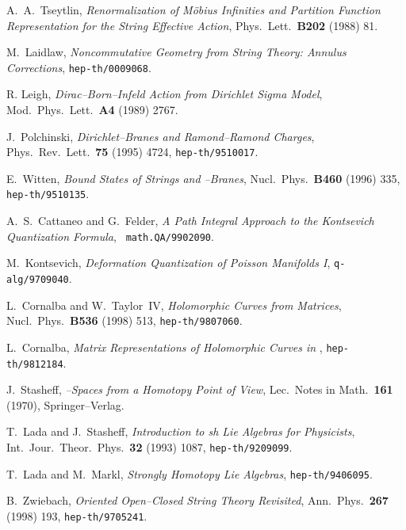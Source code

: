 \documentclass[a4paper,11pt]{article}
\begin{document}
\begin{thebibliography}{99}
{  {\small A.~A.~Tseytlin, \textit{Renormalization of
M\"obius Infinities and Partition Function Representation for the String
Effective Action}, Phys.\ Lett.\ \textbf{B202} (1988) 81. }

  {\small M.~Laidlaw, \textit{Noncommutative Geometry from
String Theory: Annulus Corrections}, \texttt{hep-th/0009068}. }

  {\small R. Leigh, \textit{Dirac--Born--Infeld Action from
Dirichlet Sigma Model}, Mod.\ Phys.\ Lett.\ \textbf{A4} (1989) 2767. }

  {\small J.~Polchinski, \textit{Dirichlet--Branes and
Ramond--Ramond Charges}, Phys.\ Rev.\ Lett.\ \textbf{75} (1995) 4724, 
\texttt{hep-th/9510017}. }

  {\small E.~Witten, \textit{Bound States of Strings and 
\coordHE{}--Branes}, Nucl.\ Phys.\ \textbf{B460} (1996) 335, \texttt{hep-th/9510135}.
}

  {\small A.~S.~Cattaneo and G.~Felder, \textit{A
Path Integral Approach to the Kontsevich Quantization Formula}, \texttt{
math.QA/9902090}. }

  {\small M.~Kontsevich, \textit{Deformation
Quantization of Poisson Manifolds I}, \texttt{q-alg/9709040}. }

  {\small L.~Cornalba and W.~Taylor~IV, \textit{
Holomorphic Curves from Matrices}, Nucl.\ Phys.\ \textbf{B536} (1998) 513, 
\texttt{hep-th/9807060}. }

  {\small L.~Cornalba, \textit{Matrix Representations of
Holomorphic Curves in \coordHE{}}, \texttt{hep-th/9812184}. }

 {\small J.~Stasheff, \textit{\coordHE{}--Spaces from a 
Homotopy Point of View}, Lec.\ Notes in Math.\ \textbf{161} (1970), 
Springer--Verlag. }

  {\small T.~Lada and J.~Stasheff, \textit{
Introduction to sh Lie Algebras for Physicists}, Int.\ Jour.\ Theor.\ Phys.\ 
\textbf{32} (1993) 1087, \texttt{hep-th/9209099}. }

  {\small T.~Lada and M.~Markl, \textit{Strongly Homotopy
Lie Algebras}, \texttt{hep-th/9406095}. }

  {\small B.~Zwiebach, \textit{Oriented Open--Closed 
String Theory Revisited}, Ann.\ Phys.\ \textbf{267} (1998) 193, 
\texttt{hep-th/9705241}. }

}
\end{thebibliography}
\end{document}
